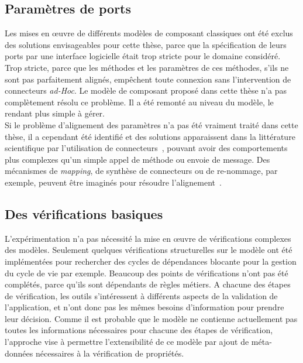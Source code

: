 \subsection{Paramètres de ports}
Les mises en \oe uvre de différents modèles de composant classiques ont été exclus des solutions envisageables pour cette thèse, parce que la spécification de leurs ports par une interface logicielle était trop stricte pour le domaine considéré. Trop stricte, parce que les méthodes et les paramètres de ces méthodes, s'ils ne sont pas parfaitement alignés, empêchent toute connexion sans l'intervention de connecteurs {\it ad-Hoc}. Le modèle de composant proposé dans cette thèse n'a pas complètement résolu ce problème. Il a été remonté au niveau du modèle, le rendant plus simple à gérer.\\
Si le problème d'alignement des paramètres n'a pas été vraiment traité dans cette thèse, il a cependant été identifié et des solutions apparaissent dans la littérature scientifique par l'utilisation de connecteurs~\cite{Matougui:2005}, pouvant avoir des comportements plus complexes qu'un simple appel de méthode ou envoie de message. Des mécanismes de {\it mapping}, de synthèse de connecteurs ou de re-nommage, par exemple, peuvent être imaginés pour résoudre l'alignement~\cite{Clavreul:2010}.



\subsection{Des vérifications basiques}
L'expérimentation n'a pas nécessité la mise en \oe uvre de vérifications complexes des modèles. Seulement quelques vérifications structurelles sur le modèle ont été implémentées pour rechercher des cycles de dépendances blocante pour la gestion du cycle de vie par exemple. Beaucoup des points de vérifications n'ont pas été complétés, parce qu'ils sont dépendants de règles métiers. A chacune des étapes de vérification, les outils s'intéressent à différents aspects de la validation de l'application, et n'ont donc pas les mêmes besoins d'information pour prendre leur décision. Comme il est probable que le modèle ne contienne actuellement pas toutes les informations nécessaires pour chacune des étapes de vérification,  l'approche vise à permettre l'extensibilité de ce modèle par ajout de méta-données nécessaires à la vérification de propriétés. 


